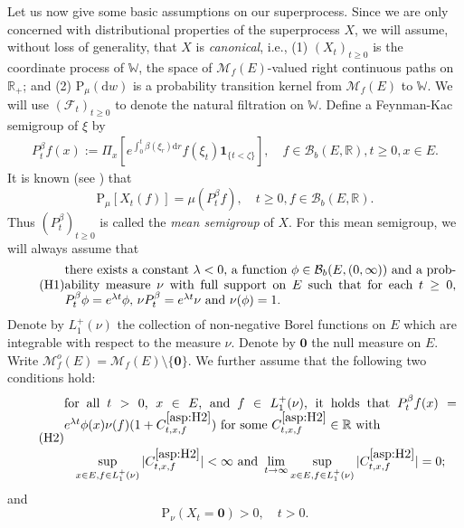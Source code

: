 \documentclass[12pt,a4paper]{amsart}
\numberwithin{equation}{section}
\theoremstyle{plain}
\theoremstyle{definition}
\theoremstyle{remark}
\begin{document}
	Let us now give some basic assumptions on our superprocess.
	Since we are only concerned with distributional properties of the superprocess $X$, we will assume, without loss of generality, that $X$ is \emph{canonical},  i.e.,
	(1) $(X_t)_{t\geq 0}$ is the coordinate process of
		$\mathbb W$,
		the space of $\mathcal M_f(E)$-valued right continuous paths on $\mathbb R_+$; and 
	(2) $\mathrm P_\mu(\mathrm dw)$ is a probability transition kernel from $\mathcal M_f(E)$ to $\mathbb W$.
	We will use $(\mathscr F_t)_{t\geq 0}$ to denote the natural filtration on $\mathbb W$.
	Define a Feynman-Kac semigroup of $\xi$ by
\begin{align}\label{eq:M.15}
	P_t^\beta f(x)
	:= \Pi_x[e^{\int_0^t \beta(\xi_r) {\mathrm d}r }f(\xi_t) \mathbf 1_{\{t < \zeta\}}],
	\quad f\in \mathcal B_b(E,\mathbb R), t\geq 0, x\in E.
\end{align}
	It is known (see \cite[Proposition 2.27]{Li2011Measure-valued}) that
\begin{equation} \label{eq:M.2}
	\mathrm P_\mu[X_t(f)] = \mu (P_t^\beta f),
	\quad t\geq 0, f \in \mathcal B_b(E,\mathbb R).
\end{equation}
	Thus $(P_t^\beta)_{t\geq 0}$ is called the \emph{mean semigroup}  of $X$.
	For this mean semigroup, we will always assume that
\begin{equation}\label{asp:H1} \tag{H1}
\begin{minipage}{0.9\textwidth}
	there exists a constant $\lambda < 0$, a function $\phi \in \mathcal B_b(E,(0,\infty))$ and a probability measure $\nu$ with full support on $E$ such that for each $t\geq 0$, $P_t^\beta \phi = e^{\lambda t} \phi$, $\nu P_t^\beta = e^{\lambda t} \nu$ and $\nu(\phi) =1$.
\end{minipage}
\end{equation}
	Denote by $L_1^+(\nu)$ the collection of non-negative Borel functions on $E$ which are integrable with respect to the measure $\nu$.
	Denote by $\mathbf 0$ the null measure on $E$.
	Write $\mathcal M_f^o(E) = \mathcal M_f(E)\setminus \{\mathbf 0\}$.
	We further assume that the following two conditions hold:
\begin{equation} \label{asp:H2} \tag{H2}
\begin{minipage}{0.9\textwidth}
	for all $t>0$, $x\in E$, and $f\in L_1^+(\nu)$, it holds that $P_t^\beta f(x) = e^{\lambda t} \phi(x) \nu(f) (1+ C^{\eqref{asp:H2}}_{t,x,f})$ for some $C^{\eqref{asp:H2}}_{t,x,f}\in \mathbb R$ with
\[
	\sup_{x\in E, f\in L_1^+(\nu)} |C^{\eqref{asp:H2}}_{t,x,f}|
	< \infty
	\text{ and }
	\lim_{t\to \infty} \sup_{x\in E, f\in L_1^+(\nu)} |C^{\eqref{asp:H2}}_{t,x,f}|
	= 0;
\]
\end{minipage}
\end{equation}
	and
\begin{equation} \label{asp:H3} \tag{H3}
	\mathrm P_\nu(X_t = \mathbf 0)>0, \quad t> 0.
\end{equation}
\end{document}
